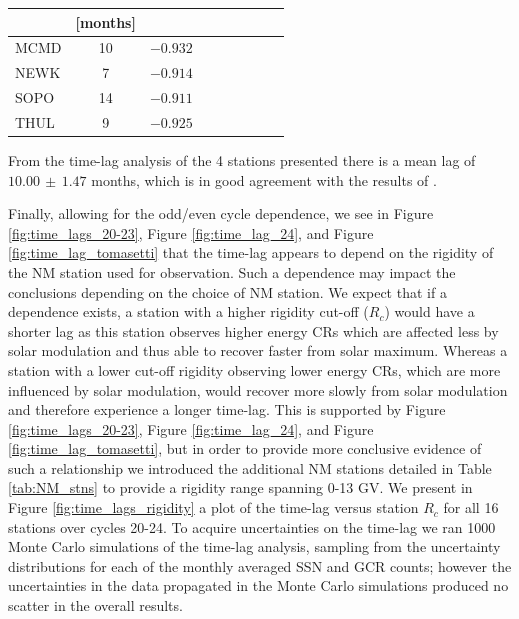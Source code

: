 {\begin{minipage}{0.42\textwidth}
\begin{tabular}{l c c c c c c c c}
			{} & {[months] } & {} \\ \hline	
			{ MCMD} & {10} & {$-0.932$} \\
			{ NEWK} & {7} & {$-0.914$} \\
			{ SOPO} & {14} & {$-0.911$} \\
			{ THUL} & {9} & {$-0.925$}  \\ \hline
		\end{tabular}
	\end{minipage}
	\hfill \break }
\medskip


From the time-lag analysis of the 4 stations presented there is a mean lag of $10.00 \, \pm \, 1.47$ months, which is in good agreement with the results of \cite{tomassetti_evidence_2017}.

Finally, allowing for the odd/even cycle dependence, we see in Figure \ref{fig:time_lags_20-23}, Figure \ref{fig:time_lag_24}, and Figure \ref{fig:time_lag_tomasetti} that the time-lag appears to depend on the rigidity of the NM station used for observation. Such a dependence may impact the conclusions depending on the choice of NM station. We expect that if a dependence exists, a station with a higher rigidity cut-off ($R_c$) would have a shorter lag as this station observes higher energy CRs which are affected less by solar modulation and thus able to recover faster from solar maximum. Whereas a station with a lower cut-off rigidity observing lower energy CRs, which are more influenced by solar modulation, would recover more slowly from solar modulation and therefore experience a longer time-lag. This is supported by Figure \ref{fig:time_lags_20-23}, Figure \ref{fig:time_lag_24}, and Figure \ref{fig:time_lag_tomasetti}, but in order to provide more conclusive evidence of such a relationship we introduced the additional NM stations detailed in Table \ref{tab:NM_stns} to provide a rigidity range spanning 0-13 GV. We present in Figure \ref{fig:time_lags_rigidity} a plot of the time-lag versus station $R_c$ for all 16 stations over cycles 20-24. To acquire uncertainties on the time-lag we ran 1000 Monte Carlo simulations of the time-lag analysis, sampling from the uncertainty distributions for each of the monthly averaged SSN and GCR counts; however the uncertainties in the data propagated in the Monte Carlo simulations produced no scatter in the overall results.

